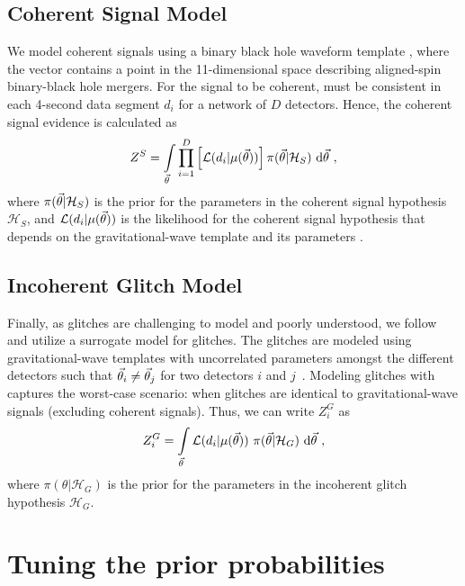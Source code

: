 \documentclass[useAMS,fleqn, usenatbib, final]{mnras}
\begin{document}
\subsection{Coherent Signal Model}
We model coherent signals using a binary black hole waveform template \template, where the vector \parameters contains a point in the 11-dimensional space describing aligned-spin binary-black hole mergers. For the signal to be coherent, \parameters must be consistent in each 4-second data segment $d_i$ for a network of $D$ detectors. Hence, the coherent signal evidence is calculated as
\begin{equation}
\label{eq:zs}
Z^S = \int\limits_{\parameters} \prod\limits^{D}_{i=1} \left[ \mathcal{L}(d_i|\template)\right] \pi(\parameters | \mathcal{H}_S)\  \text{d}\parameters \ ,
\end{equation}
where $\pi(\parameters| \mathcal{H}_S)$ is the prior for the parameters in the coherent signal hypothesis $\mathcal{H}_S$, and $\mathcal{L}(d_i|\template)$ is the likelihood for the coherent signal hypothesis that depends on the gravitational-wave template \template and its parameters \parameters. 

\subsection{Incoherent Glitch Model}
Finally, as glitches are challenging to model and poorly understood, we follow \citet{bci} and utilize a surrogate model for glitches. The glitches are modeled using gravitational-wave templates  \template with uncorrelated parameters amongst the different detectors such that  $\parameters_i \neq \parameters_j$ for two detectors $i$ and $j$~\citep{bci}.  Modeling glitches with \template captures the worst-case scenario: when glitches are identical to gravitational-wave signals (excluding coherent signals). Thus, we can write $Z^G_i$ as 
\begin{equation}
\label{eq:zg}
Z^G_i = \int\limits_{\parameters} \mathcal{L}(d_i|\template)\ \pi(\parameters| \mathcal{H}_G)\  \text{d}\parameters  \ ,
\end{equation}
where $\pi(\theta| \mathcal{H}_G)$ is the prior for the parameters in the incoherent glitch hypothesis $\mathcal{H}_G$. 



\section{Tuning the prior probabilities}\label{apdx:tuning-prior-odds}
\end{document}
